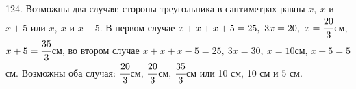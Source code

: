 124. Возможны два случая: стороны треугольника в сантиметрах равны $x,\ x$ и $x+5$ или $x,\ x$ и $x-5.$ В первом случае $x+x+x+5=25,\ 3x=20,\ x=\cfrac{20}{3}$см, $x+5=\cfrac{35}{3}$см, во втором случае $x+x+x-5=25,\ 3x=30,\ x=10$см, $x-5=5$см. Возможны оба случая: $\cfrac{20}{3}$см, $\cfrac{20}{3}$см, $\cfrac{35}{3}$см или 10 см, 10 см и 5 см.\\
